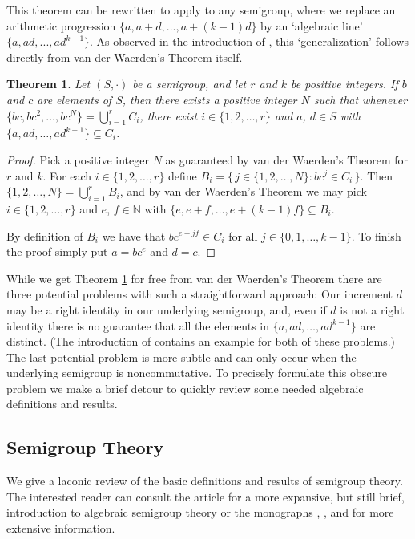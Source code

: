\documentclass[12pt,showtrims]{memoir}
\theoremstyle{plain}
\newtheorem{thm}{Theorem}[section]
\theoremstyle{definition}
\newcommand{\bbN}{\mathbb{N}}
\begin{document}
This theorem can be rewritten to apply to any semigroup, where we replace an arithmetic progression $\{a, a+d, ..., a+(k-1)d\}$ by an `algebraic line' $\{a, ad, ..., ad^{k-1}\}$. As observed in the introduction of \cite{Bergelson:1992fk}, this `generalization' follows directly from van der Waerden's Theorem itself. 

\begin{thm}
  \label{thm:semigrp-vdw}
  Let $(S, \cdot)$ be a semigroup, and let $r$ and $k$ be positive integers.
  If $b$ and $c$ are elements of $S$, then there exists a positive integer $N$ such that whenever $\{bc, bc^2, \ldots, bc^N\} = \bigcup_{i=1}^r C_i$, there exist $i \in \{1, 2, \ldots, r\}$ and $a$, $d \in S$ with $\{a, ad, \ldots, ad^{k-1}\} \subseteq C_i$.
\end{thm}
\begin{proof}
  Pick a positive integer $N$ as guaranteed by van der Waerden's Theorem for $r$ and $k$.
  For each $i \in \{1, 2, \ldots, r\}$ define $B_i = \bigl\{\, j \in \{1, 2, \ldots, N\} : bc^j \in C_i \,\bigr\}$.
  Then $\{1, 2, \ldots, N\} = \bigcup_{i=1}^r B_i$, and by van der Waerden's Theorem we may pick $i \in \{1, 2, \ldots, r\}$ and $e$, $f \in \bbN$ with $\{e, e+f, \ldots, e+(k-1)f\} \subseteq B_i$.
  
  By definition of $B_i$ we have that $bc^{e+jf} \in C_i$ for all $j \in \{0, 1, \ldots, k-1\}$.
  To finish the proof simply put $a = bc^e$ and $d = c$.
\end{proof}

While we get Theorem \ref{thm:semigrp-vdw} for free from van der Waerden's Theorem there are three potential problems with such a straightforward approach:
Our increment $d$ may be a right identity in our underlying semigroup, and, even if $d$ is not a right identity there is no guarantee that all the elements in $\{a, ad, \ldots, ad^{k-1}\}$ are distinct.
(The introduction of \cite{Bergelson:1992fk} contains an example for both of these problems.)
The last potential problem is more subtle and can only occur when the underlying semigroup is noncommutative.
To precisely formulate this obscure problem we make a brief detour to quickly review some needed algebraic definitions and results.

\subsection{Semigroup Theory}
We give a laconic review of the basic definitions and results of semigroup theory.
The interested reader can consult the article \cite{Hollings:2007uq} for a more expansive, but still brief, introduction to algebraic semigroup theory or the monographs \cite{Clifford:1961fk}, \cite{Clifford:1967fk}, and \cite[Chapter 1]{Hindman:1998fk} for more extensive information. 
\end{document}
